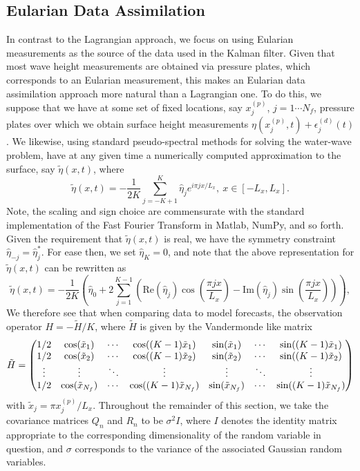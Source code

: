 \subsection*{Eularian Data Assimilation}
In contrast to the Lagrangian approach, we focus on using Eularian measurements as the source of the data used in the Kalman filter.  Given that most wave height measurements are obtained via pressure plates, which corresponds to an Eularian measurement, this makes an Eularian data assimilation approach more natural than a Lagrangian one.  To do this, we suppose that we have at some set of fixed locations, say $x^{(p)}_{j}$, $j=1\cdots N_{f}$, pressure plates over which we obtain surface height measurements $\eta(x^{(p)}_{j},t)+\epsilon^{(d)}_{j}(t)$.  We likewise, using standard pseudo-spectral methods for solving the water-wave problem, have at any given time a numerically computed approximation to the surface, say $\tilde{\eta}(x,t)$, where 
\[
\tilde{\eta}(x,t) = -\frac{1}{2K}\sum_{j=-K+1}^{K}\hat{\eta}_{j}e^{i\pi jx/L_{x}}, ~ x \in [-L_{x},L_{x}].
\]
Note, the scaling and sign choice are commensurate with the standard implementation of the Fast Fourier Transform in Matlab, NumPy, and so forth.  Given the requirement that $\tilde{\eta}(x,t)$ is real, we have the symmetry constraint $\hat{\eta}_{-j} = \hat{\eta}^{\ast}_{j}$.  For ease then, we set $\hat{\eta}_{K}=0$, and note that the above representation for $\tilde{\eta}(x,t)$ can be rewritten as 
\[
\tilde{\eta}(x,t) = -\frac{1}{2K}\left(\hat{\eta}_{0} + 2\sum_{j=1}^{K-1} \left( \mbox{Re}(\hat{\eta}_{j})\cos\left(\frac{\pi j x}{L_{x}}\right) -  \mbox{Im}(\hat{\eta}_{j})\sin\left(\frac{\pi j x}{L_{x}}\right)\right) \right), 
\]
We therefore see that when comparing data to model forecasts, the observation operator $H=-\tilde{H}/K$, where $\tilde{H}$ is given by the Vandermonde like matrix
\[
\tilde{H} =
\begin{pmatrix} 
1/2 & \cos(\tilde{x}_{1})  & \cdots & \cos( (K-1) \tilde{x}_{1}) & \sin(\tilde{x}_{1}) & \cdots &  \sin( (K-1) \tilde{x}_{1}) \\  
1/2 & \cos(\tilde{x}_{2})  & \cdots & \cos( (K-1) \tilde{x}_{2}) & \sin(\tilde{x}_{2}) & \cdots &  \sin( (K-1) \tilde{x}_{2}) \\
\vdots & \vdots & \ddots & \vdots & \vdots & \ddots & \vdots \\ 
1/2 & \cos(\tilde{x}_{N_{f}})  & \cdots & \cos( (K-1) \tilde{x}_{N_{f}}) & \sin(\tilde{x}_{N_{f}}) & \cdots &  \sin( (K-1) \tilde{x}_{N_{f}})
\end{pmatrix} 
\]
with $\tilde{x}_{j} = \pi x^{(p)}_{j}/L_{x}$.  Throughout the remainder of this section, we take the covariance matrices $Q_{n}$ and $R_{n}$ to be $\sigma^{2}I$, where $I$ denotes the identity matrix appropriate to the corresponding dimensionality of the random variable in question, and $\sigma$ corresponds to the variance of the associated Gaussian random variables.  

